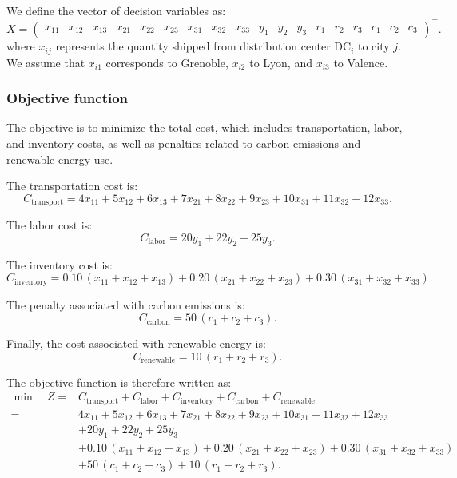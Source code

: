 We define the vector of decision variables as:
\[
X = \begin{pmatrix}
x_{11} & x_{12} & x_{13} & x_{21} & x_{22} & x_{23} & x_{31} & x_{32} & x_{33} &
y_1 & y_2 & y_3 & r_1 & r_2 & r_3 & c_1 & c_2 & c_3
\end{pmatrix}^{\!\top}.
\]
where \(x_{ij}\) represents the quantity shipped from distribution center
\(\mathrm{DC}_i\) to city \(j\). We assume that \(x_{i1}\) corresponds to Grenoble, \(x_{i2}\) to Lyon, and
\(x_{i3}\) to Valence.

\subsubsection{Objective function}

The objective is to minimize the total cost, which includes transportation,
labor, and inventory costs, as well as penalties related to carbon emissions
and renewable energy use.

The transportation cost is:
\[
C_{\mathrm{transport}} =
4x_{11} + 5x_{12} + 6x_{13}
+ 7x_{21} + 8x_{22} + 9x_{23}
+ 10x_{31} + 11x_{32} + 12x_{33}.
\]

The labor cost is:
\[
C_{\mathrm{labor}} = 20y_1 + 22y_2 + 25y_3.
\]

The inventory cost is:
\[
C_{\mathrm{inventory}} =
0.10\,(x_{11} + x_{12} + x_{13})
+ 0.20\,(x_{21} + x_{22} + x_{23})
+ 0.30\,(x_{31} + x_{32} + x_{33}).
\]

The penalty associated with carbon emissions is:
\[
C_{\mathrm{carbon}} = 50\,(c_1 + c_2 + c_3).
\]

Finally, the cost associated with renewable energy is:
\[
C_{\mathrm{renewable}} = 10\,(r_1 + r_2 + r_3).
\]

The objective function is therefore written as:
\[
\boxed{
\begin{aligned}
\min \quad Z ={}& C_{\mathrm{transport}} + C_{\mathrm{labor}} + C_{\mathrm{inventory}}
+ C_{\mathrm{carbon}} + C_{\mathrm{renewable}} \\
={}& 4x_{11} + 5x_{12} + 6x_{13} + 7x_{21} + 8x_{22} + 9x_{23}
+ 10x_{31} + 11x_{32} + 12x_{33} \\
&+ 20y_1 + 22y_2 + 25y_3 \\
&+ 0.10\,(x_{11} + x_{12} + x_{13})
+ 0.20\,(x_{21} + x_{22} + x_{23})
+ 0.30\,(x_{31} + x_{32} + x_{33}) \\
&+ 50\,(c_1 + c_2 + c_3) + 10\,(r_1 + r_2 + r_3).
\end{aligned}
}
\]

